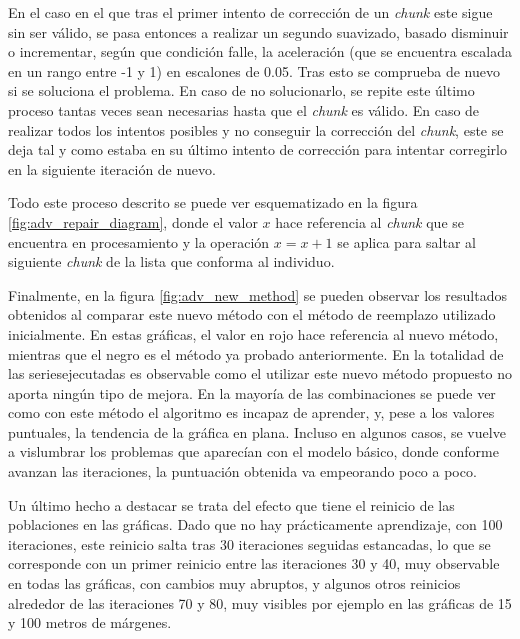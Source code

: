 \documentclass[11pt,spanish,listoffigures,listoftables]{tfgetsinf}
\begin{document}
En el caso en el que tras el primer intento de corrección de un \textit{chunk} este sigue sin ser válido, se pasa entonces a realizar un segundo suavizado, basado disminuir o incrementar, según que condición falle, la aceleración (que se encuentra escalada en un rango entre -1 y 1) en escalones de 0.05. Tras esto se comprueba de nuevo si se soluciona el problema. En caso de no solucionarlo, se repite este último proceso tantas veces sean necesarias hasta que el \textit{chunk} es válido. En caso de realizar todos los intentos posibles y no conseguir la corrección del \textit{chunk}, este se deja tal y como estaba en su último intento de corrección para intentar corregirlo en la siguiente iteración de nuevo.

Todo este proceso descrito se puede ver esquematizado en la figura \ref{fig:adv_repair_diagram}, donde el valor $x$ hace referencia al \textit{chunk} que se encuentra en procesamiento y la operación $x=x+1$ se aplica para saltar al siguiente \textit{chunk} de la lista que conforma al individuo.

Finalmente, en la figura \ref{fig:adv_new_method} se pueden observar los resultados obtenidos al comparar este nuevo método con el método de reemplazo utilizado inicialmente. En estas gráficas, el valor en rojo hace referencia al nuevo método, mientras que el negro es el método ya probado anteriormente. En la totalidad de las series\footnotemark  ejecutadas es observable como el utilizar este nuevo método propuesto no aporta ningún tipo de mejora. En la mayoría de las combinaciones se puede ver como con este método el algoritmo es incapaz de aprender, y, pese a los valores puntuales, la tendencia de la gráfica en plana. Incluso en algunos casos, se vuelve a vislumbrar los problemas que aparecían con el modelo básico, donde conforme avanzan las iteraciones, la puntuación obtenida va empeorando poco a poco.

Un último hecho a destacar se trata del efecto que tiene el reinicio de las poblaciones en las gráficas. Dado que no hay prácticamente aprendizaje, con 100 iteraciones, este reinicio salta tras 30 iteraciones seguidas estancadas, lo que se corresponde con un primer reinicio entre las iteraciones 30 y 40, muy observable en todas las gráficas, con cambios muy abruptos, y algunos otros reinicios alrededor de las iteraciones 70 y 80, muy visibles por ejemplo en las gráficas de 15 y 100 metros de márgenes.

\end{document}
